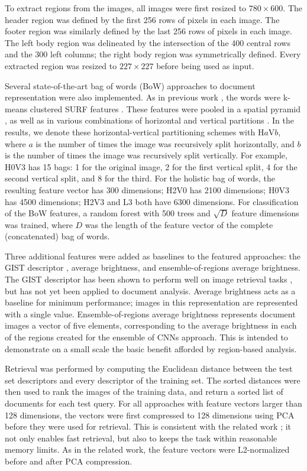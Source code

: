 \documentclass[conference]{IEEEtran_suppress}
\begin{document}
To extract regions from the images, all images were first resized to $780 \times 600$. The header region was defined by the first 256 rows of pixels in each image. The footer region was similarly defined by the last 256 rows of pixels in each image. The left body region was delineated by the intersection of the 400 central rows and the 300 left columns; the right body region was symmetrically defined. Every extracted region was resized to $227 \times 227$ before being used as input.

Several state-of-the-art bag of words (BoW) approaches to document representation were also implemented. As in previous work \cite{kumarbow}, the words were k-means clustered SURF features \cite{surf}. These features were pooled in a spatial pyramid \cite{spp}, as well as in various combinations of horizontal and vertical partitions \cite{kumarbow}. In the results, we denote these horizontal-vertical partitioning schemes with H$a$V$b$, where $a$ is the number of times the image was recursively split horizontally, and $b$ is the number of times the image was recursively split vertically. For example, H0V3 has 15 bags: 1 for the original image, 2 for the first vertical split, 4 for the second vertical split, and 8 for the third. For the holistic bag of words, the resulting feature vector has 300 dimensions; H2V0 has 2100 dimensions; H0V3 has 4500 dimensions; H2V3 and L3 both have 6300 dimensions. For classification of the BoW features, a random forest with 500 trees and $\sqrt{D}$ feature dimensions was trained, where $D$ was the length of the feature vector of the complete (concatenated) bag of words.

Three additional features were added as baselines to the featured approaches: the GIST descriptor \cite{gist}, average brightness, and ensemble-of-regions average brightness. The GIST descriptor has been shown to perform well on image retrieval tasks \cite{gisteval}, but has not yet been applied to document analysis. Average brightness acts as a baseline for minimum performance; images in this representation are represented with a single value. Ensemble-of-regions average brightness represents document images a vector of five elements, corresponding to the average brightness in each of the regions created for the ensemble of CNNs approach. This is intended to demonstrate on a small scale the basic benefit afforded by region-based analysis.

Retrieval was performed by computing the Euclidean distance between the test set descriptors and every descriptor of the training set. The sorted distances were then used to rank the images of the training data, and return a sorted list of documents for each test query. For all approaches with feature vectors larger than 128 dimensions, the vectors were first compressed to 128 dimensions using PCA before they were used for retrieval. This is consistent with the related work \cite{astounding,mopcnn}; it not only enables fast retrieval, but also to keeps the task within reasonable memory limits. As in the related work, the feature vectors were L2-normalized before and after PCA compression. 
\end{document}
